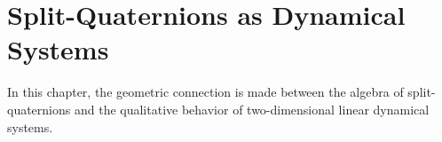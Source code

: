 \chapter{Split-Quaternions as Dynamical Systems}
\label{chap:quaternion}
In this chapter, the geometric connection is made between the algebra of split-quaternions and the qualitative behavior of two-dimensional linear dynamical systems. 





